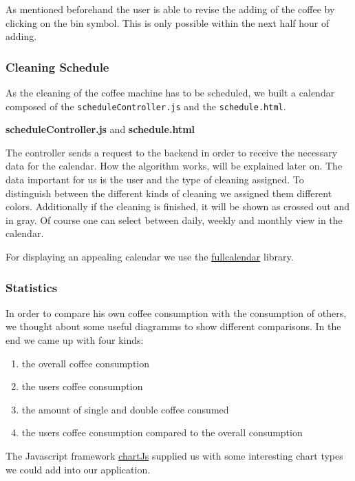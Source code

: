 As mentioned beforehand the user is able to revise the adding of the
coffee by clicking on the bin symbol. This is only possible within the
next half hour of adding.

\subsubsection{Cleaning Schedule}\label{cleaning-schedule}

As the cleaning of the coffee machine has to be scheduled, we built a
calendar composed of the \texttt{scheduleController.js} and the
\texttt{schedule.html}.

\textbf{scheduleController.js} and \textbf{schedule.html}

The controller sends a request to the backend in order to receive the
necessary data for the calendar. How the algorithm works, will be
explained later on. The data important for us is the user and the type
of cleaning assigned. To distinguish between the different kinds of
cleaning we assigned them different colors. Additionally if the cleaning
is finished, it will be shown as crossed out and in gray. Of course one
can select between daily, weekly and monthly view in the calendar.

For displaying an appealing calendar we use the
\href{http://fullcalendar.io/}{fullcalendar} library.

\subsubsection{Statistics}\label{statistics}

In order to compare his own coffee consumption with the consumption of
others, we thought about some useful diagramms to show different
comparisons. In the end we came up with four kinds:

\begin{enumerate}
\def\labelenumi{\arabic{enumi}.}
\item
  the overall coffee consumption
\item
  the users coffee consumption
\item
  the amount of single and double coffee consumed
\item
  the users coffee consumption compared to the overall consumption
\end{enumerate}

The Javascript framework \href{chartjs.org/docs/}{chartJs} supplied us
with some interesting chart types we could add into our application.

